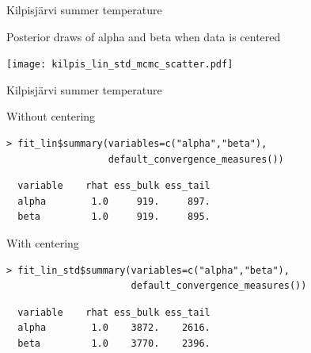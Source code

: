 \documentclass[finnish,english,t]{beamer}
\begin{document}
\begin{frame}[fragile]{Kilpisjärvi summer temperature}
  
  Posterior draws of alpha and beta when data is centered
  
  \begin{center}
    \texttt{[image: kilpis\_lin\_std\_mcmc\_scatter.pdf]}
  \end{center}

\end{frame}

\begin{frame}[fragile]{Kilpisjärvi summer temperature}

Without centering  
{\footnotesize
\begin{verbatim}
> fit_lin$summary(variables=c("alpha","beta"),
                  default_convergence_measures())
\end{verbatim}
  \vspace{-\baselineskip}
\begin{verbatim}
  variable    rhat ess_bulk ess_tail
  alpha        1.0     919.     897.
  beta         1.0     919.     895.
\end{verbatim}
  }

With centering  
{\footnotesize
\begin{verbatim}
> fit_lin_std$summary(variables=c("alpha","beta"),
                      default_convergence_measures())
\end{verbatim}
  \vspace{-\baselineskip}
\begin{verbatim}
  variable    rhat ess_bulk ess_tail
  alpha        1.0    3872.    2616.
  beta         1.0    3770.    2396.
\end{verbatim}
  }
\end{frame}
\end{document}
